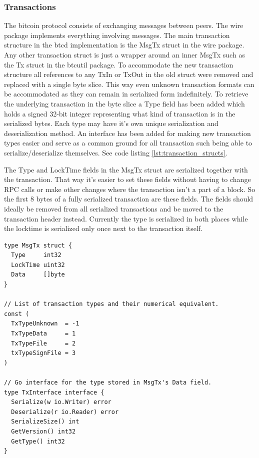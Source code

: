 \documentclass[12pt]{article}
\begin{document}
\subsubsection{Transactions}\label{subsec:transactions}
The bitcoin protocol consists of exchanging messages between peers. The wire package implements everything involving messages. The main transaction structure in the btcd implementation is the MsgTx struct in the wire package. Any other transaction struct is just a wrapper around an inner MsgTx such as the Tx struct in the btcutil package.
 To accommodate the new transaction structure all references to any TxIn or 
TxOut in the old struct were removed and replaced with a single byte slice. This way even unknown transaction formats can be accommodated as they can remain in serialized form indefinitely. To retrieve the underlying transaction in the byte slice a Type field has been added which holds a signed 32-bit integer representing what kind of transaction is in the serialized bytes. Each type may have it's own unique serialization and deserialization method. An interface has been added for making new transaction types easier and serve as a common ground for all transaction such being able to serialize/deserialize themselves. See code listing \ref{lst:transaction_structs}.

The Type and LockTime fields in the MsgTx struct are serialized together with the transaction. That way it's easier to set these fields without having to change RPC calls or make other changes where the transaction isn't a part of a block. So the first 8 bytes of a fully serialized transaction are these fields. The fields should ideally be removed from all serialized transactions and be moved to the transaction header instead. Currently the type is serialized in both places while the locktime is serialized only once next to the transaction itself.

\begin{lstlisting}[float=h!,caption={Transaction structure},label=lst:transaction_structs]
type MsgTx struct {
  Type     int32
  LockTime uint32
  Data     []byte
}

// List of transaction types and their numerical equivalent.
const (
  TxTypeUnknown  = -1
  TxTypeData     = 1
  TxTypeFile     = 2
  txTypeSignFile = 3
)

// Go interface for the type stored in MsgTx's Data field.
type TxInterface interface {
  Serialize(w io.Writer) error
  Deserialize(r io.Reader) error
  SerializeSize() int
  GetVersion() int32
  GetType() int32
}
\end{lstlisting}
\end{document}
